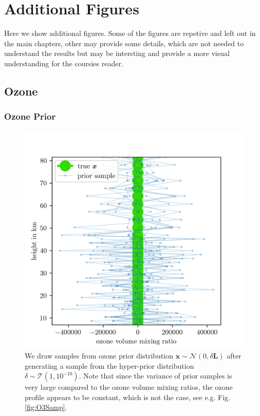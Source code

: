 \chapter{Additional Figures}
\label{ap:addFig}
Here we show additional figures.
Some of the figures are repetive and left out in the main chapters, other may provide some details, which are not needed to understand the results but may be intersting and provide a more visual understanding for the coursies reader.
\clearpage
\section{Ozone}
\subsection{Ozone Prior}
\begin{figure}[ht!]
	\centering
	\includegraphics{OzonePrior.png}
	\caption[Samples from ozone prior distribution.]{We draw samples from ozone prior distribution $\bm{x} \sim \mathcal{N}(0,\delta \bm{L})$ after generating a sample from the hyper-prior distribution $\delta \sim \mathcal{T}(1,10^{-10})$. Note that since the variance of prior samples is very large compared to the ozone volume mixing ratios, the ozone profile appears to be constant, which is not the case, see e.g. Fig. \ref{fig:O3Samp}.}
	\label{fig:O3Prior}
\end{figure}
\clearpage
